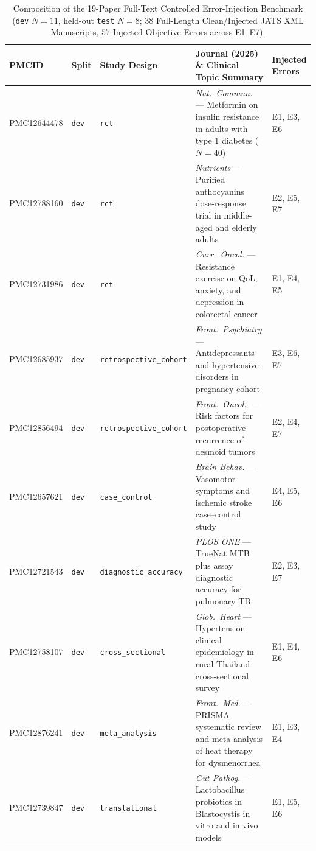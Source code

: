 \documentclass[11pt,a4paper]{article}
\begin{document}
\begin{table}[!t]
\centering
\caption{Composition of the 19-Paper Full-Text Controlled Error-Injection Benchmark (\texttt{dev} $N=11$, held-out \texttt{test} $N=8$; $38$ Full-Length Clean/Injected JATS XML Manuscripts, $57$ Injected Objective Errors across E1--E7).}
\label{tab:corpus_breakdown}
\vspace{2pt}
\scriptsize
\setlength{\tabcolsep}{3.5pt}
\begin{tabularx}{\textwidth}{@{}>{\ttfamily}l l l >{\raggedright\arraybackslash}X l@{}}
\toprule
\normalfont\textbf{PMCID} & \textbf{Split} & \textbf{Study Design} & \textbf{Journal (2025) \& Clinical Topic Summary} & \textbf{Injected Errors} \\
\midrule
PMC12644478 & \texttt{dev} & \texttt{rct} & \emph{Nat.\ Commun.} --- Metformin on insulin resistance in adults with type 1 diabetes ($N=40$) & E1, E3, E6 \\
PMC12788160 & \texttt{dev} & \texttt{rct} & \emph{Nutrients} --- Purified anthocyanins dose-response trial in middle-aged and elderly adults & E2, E5, E7 \\
PMC12731986 & \texttt{dev} & \texttt{rct} & \emph{Curr.\ Oncol.} --- Resistance exercise on QoL, anxiety, and depression in colorectal cancer & E1, E4, E5 \\
PMC12685937 & \texttt{dev} & \texttt{retrospective\_cohort} & \emph{Front.\ Psychiatry} --- Antidepressants and hypertensive disorders in pregnancy cohort & E3, E6, E7 \\
PMC12856494 & \texttt{dev} & \texttt{retrospective\_cohort} & \emph{Front.\ Oncol.} --- Risk factors for postoperative recurrence of desmoid tumors & E2, E4, E7 \\
PMC12657621 & \texttt{dev} & \texttt{case\_control} & \emph{Brain Behav.} --- Vasomotor symptoms and ischemic stroke case--control study & E4, E5, E6 \\
PMC12721543 & \texttt{dev} & \texttt{diagnostic\_accuracy} & \emph{PLOS ONE} --- TrueNat MTB plus assay diagnostic accuracy for pulmonary TB & E2, E3, E7 \\
PMC12758107 & \texttt{dev} & \texttt{cross\_sectional} & \emph{Glob.\ Heart} --- Hypertension clinical epidemiology in rural Thailand cross-sectional survey & E1, E4, E6 \\
PMC12876241 & \texttt{dev} & \texttt{meta\_analysis} & \emph{Front.\ Med.} --- PRISMA systematic review and meta-analysis of heat therapy for dysmenorrhea & E1, E3, E4 \\
PMC12739847 & \texttt{dev} & \texttt{translational} & \emph{Gut Pathog.} --- Lactobacillus probiotics in Blastocystis in vitro and in vivo models & E1, E5, E6 \\

\end{tabularx}
\end{table}
\end{document}
